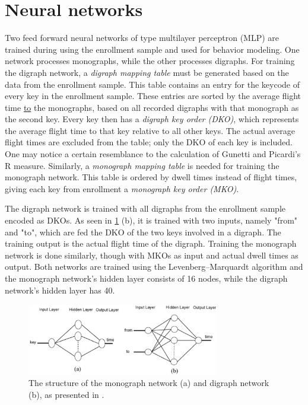 \documentclass[informationsecurity]{gucmasterproject}
\begin{document}
\section{Neural networks}
Two feed forward neural networks of type multilayer perceptron (MLP) are trained during using the enrollment sample and used for behavior modeling.
One network processes monographs, while the other processes digraphs.
For training the digraph network, a \textit{digraph mapping table} must be generated based on the data from the enrollment sample.
This table contains an entry for the keycode of every key in the enrollment sample.
These entries are sorted by the average flight time \underline{to} the monographs, based on all recorded digraphs with that monograph as the second key.
Every key then has a \textit{digraph key order (DKO)}, which represents the average flight time to that key relative to all other keys. 
The actual average flight times are excluded from the table; only the DKO of each key is included.
One may notice a certain resemblance to the calculation of Gunetti and Picardi's \cite{gnp} R measure.
Similarly, a \textit{monograph mapping table} is needed for training the monograph network. 
This table is ordered by dwell times instead of flight times, giving each key from enrollment a \textit{monograph key order (MKO)}.

The digraph network is trained with all digraphs from the enrollment sample encoded as DKOs.
As seen in \cref{fig:ahmed-networks} (b), it is trained with two inputs, namely "from" and "to", which are fed the DKO of the two keys involved in a digraph. 
The training output is the actual flight time of the digraph.
Training the monograph network is done similarly, though with MKOs as input and actual dwell times as output.
Both networks are trained using the Levenberg–Marquardt \cite{levenberg_1944} algorithm and the monograph network's hidden layer consists of 16 nodes, while the digraph network's hidden layer has 40.

\begin{figure}[h]
    \centering
    \includegraphics[width=0.75\textwidth]{ahmed/networks}
    \caption{The structure of the monograph network (a) and digraph network (b), as presented in \cite{Ahmed}.}
    \label{fig:ahmed-networks}
\end{figure}
\end{document}
